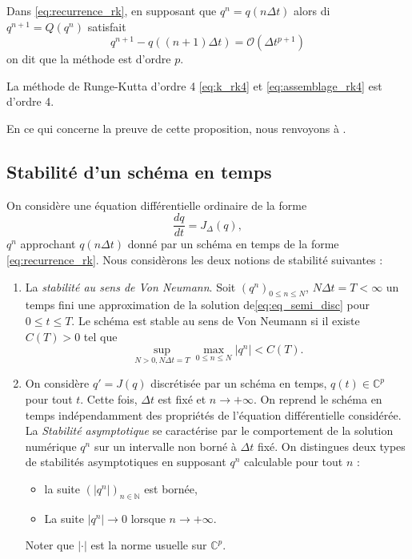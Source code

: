Dans \eqref{eq:recurrence_rk}, en supposant que $q^n = q(n \Delta t)$ alors di $q^{n+1}=Q(q^n)$ satisfait 
\begin{equation}
q^{n+1} - q((n+1) \Delta t) = \mathcal{O}(\Delta t^{p+1})
\end{equation}
on dit que la méthode est d'ordre $p$.

\begin{proposition}
La méthode de Runge-Kutta d'ordre 4 \eqref{eq:k_rk4} et \eqref{eq:assemblage_rk4} est d'ordre 4.
\end{proposition}
En ce qui concerne la preuve de cette proposition, nous renvoyons à \cite{Demailly2016}.


\subsection{Stabilité d'un schéma en temps}

On considère une équation différentielle ordinaire de la forme
\begin{equation}
\dfrac{dq}{dt} = J_{\Delta}(q),
\label{eq:eq_semi_disc}
\end{equation}
$q^n$ approchant $q(n \Delta t)$ donné par un schéma en temps de la forme \eqref{eq:recurrence_rk}. Nous considèrons les deux notions de stabilité suivantes :
\begin{enumerate}
\item La \textit{stabilité au sens de Von Neumann}. Soit $(q^n)_{0 \leq n \leq N}$, $N \Delta t = T < \infty$ un temps fini une approximation de la solution de\eqref{eq:eq_semi_disc} pour $0 \leq t \leq T$. Le schéma est stable au sens de Von Neumann si il existe $C(T)>0$ tel que
\begin{equation}
\sup_{N>0, N \Delta t = T} \max_{0 \leq n \leq N} |q^n| < C(T).
\end{equation}

\item On considère $q'=J(q)$ discrétisée par un schéma en temps, $q(t) \in \mathbb{C}^p$ pour tout $t$. Cette fois, $\Delta t$ est fixé et $n \rightarrow + \infty$. On reprend le schéma en temps indépendamment des propriétés de l'équation différentielle considérée. La \textit{Stabilité asymptotique} se caractérise par le comportement de la solution numérique $q^n$ sur un intervalle non borné à $\Delta t$ fixé. On distingues deux types de stabilités asymptotiques en supposant $q^n$ calculable pour tout $n$ :
\begin{itemize}
\item la suite $(|q^n|)_{n \in \mathbb{N}}$ est bornée,
\item La suite $|q^n| \rightarrow 0$ lorsque $n \rightarrow + \infty$.
\end{itemize}
Noter que $|\cdot|$ est la norme usuelle sur $\mathbb{C}^p$.
\end{enumerate} 

